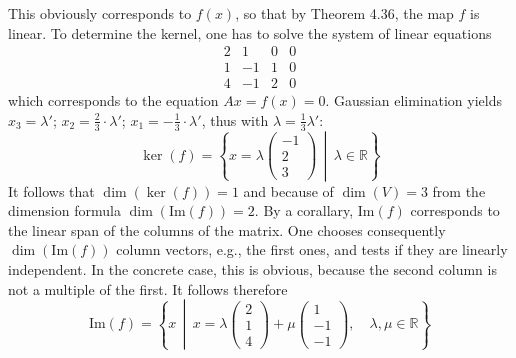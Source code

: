 This obviously corresponds to \(f(x)\), so that by Theorem 4.36, the map \(f\) is linear. To determine the kernel, one has to solve the system of linear equations
\[
\begin{array}{cccc}
2 & 1 & 0 & 0 \\
1 & -1 & 1 & 0 \\
4 & -1 & 2 & 0
\end{array}
\]
which corresponds to the equation \(Ax = f(x) = 0\). Gaussian elimination yields \(x_3 = \lambda'\); \(x_2 = \frac{2}{3} \cdot \lambda'\); \(x_1 = -\frac{1}{3} \cdot \lambda'\), thus with \(\lambda = \frac{1}{3} \lambda'\):
\[
\ker(f) =
\left\{
x = \lambda
\begin{pmatrix}
-1 \\
2 \\
3
\end{pmatrix}
\, \middle| \, \lambda \in \mathbb{R}
\right\}
\]
It follows that \(\dim(\ker(f)) = 1\) and because of \(\dim(V) = 3\) from the dimension 
formula \(\dim(\text{Im}(f)) = 2\). By a corallary, \(\text{Im}(f)\) corresponds to the linear 
span of the columns of the matrix. One chooses consequently \(\dim(\text{Im}(f))\) column vectors, e.g., the first ones, and tests if they are linearly independent. In the concrete case, this is obvious, because the second column is 
not a multiple of the first. It follows therefore
\[
\text{Im}(f) =
\left\{
x \, \middle| \, x = \lambda
\begin{pmatrix}
2 \\
1 \\
4
\end{pmatrix} + \mu
\begin{pmatrix}
1 \\
-1 \\
-1
\end{pmatrix}
, \quad \lambda, \mu \in \mathbb{R}
\right\}
\]


\newpage